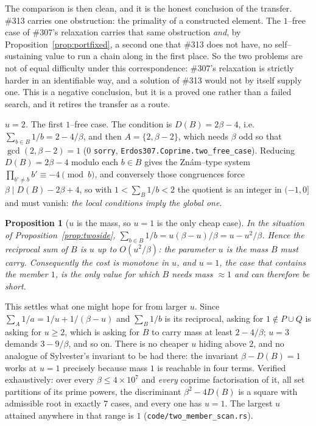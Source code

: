 \documentclass[11pt]{article}
\newtheorem{proposition}[theorem]{Proposition}
\theoremstyle{definition}
\begin{document}
The comparison is then clean, and it is the honest conclusion of the transfer. \#313 carries one
obstruction: the primality of a constructed element. The $1$--free case of \#307's relaxation
carries that same obstruction \emph{and}, by Proposition~\ref{prop:portfixed}, a second one that
\#313 does not have, no self--sustaining value to run a chain along in the first place. So the two
problems are not of equal difficulty under this correspondence: \#307's relaxation is strictly harder
in an identifiable way, and a solution of \#313 would not by itself supply one. This is a negative
conclusion, but it is a proved one rather than a failed search, and it retires the transfer as a
route.


\emph{$u=2$.} The first $1$--free case. The condition is $D(B)=2\beta-4$, i.e.\
$\sum_{b\in B}1/b=2-4/\beta$, and then $A=\{2,\beta-2\}$, which needs $\beta$ odd so that
$\gcd(2,\beta-2)=1$ \textup{(}$0$ \texttt{sorry}, \texttt{Erdos307.Coprime.two\_free\_case}\textup{)}.
Reducing $D(B)=2\beta-4$ modulo each $b\in B$ gives the Znám--type system
$\prod_{b'\ne b}b'\equiv-4\pmod b$, and conversely those congruences force
$\beta\mid D(B)-2\beta+4$, so with $1<\sum_B1/b<2$ the quotient is an integer in $(-1,0]$ and must
vanish: \emph{the local conditions imply the global one}.

\begin{proposition}[$u$ is the mass, so $u=1$ is the only cheap case]\label{prop:umass}
In the situation of Proposition~\ref{prop:twoside}, $\sum_{b\in B}1/b=u(\beta-u)/\beta=u-u^2/\beta$.
Hence the reciprocal sum of $B$ is $u$ up to $O(u^2/\beta)$: the parameter $u$ \emph{is} the mass
$B$ must carry. Consequently the cost is monotone in $u$, and $u=1$, the case that contains the
member $1$, is the only value for which $B$ needs mass $\approx1$ and can therefore be short.
\end{proposition}

This settles what one might hope for from larger $u$. Since $\sum_A1/a=1/u+1/(\beta-u)$ and
$\sum_B1/b$ is its reciprocal, asking for $1\notin P\cup Q$ is asking for $u\ge2$, which is asking
for $B$ to carry mass at least $2-4/\beta$; $u=3$ demands $3-9/\beta$, and so on. There is no
cheaper $u$ hiding above $2$, and no analogue of Sylvester's invariant to be had there: the
invariant $\beta-D(B)=1$ works at $u=1$ precisely because mass $1$ is reachable in four terms.
Verified exhaustively: over every $\beta\le4\times10^{7}$ and \emph{every} coprime factorisation of
it, all set partitions of its prime powers, the discriminant $\beta^2-4D(B)$ is a square with
admissible root in exactly $7$ cases, and every one has $u=1$. The largest $u$ attained anywhere in
that range is $1$ \textup{(\texttt{code/two\_member\_scan.rs})}.
\end{document}
